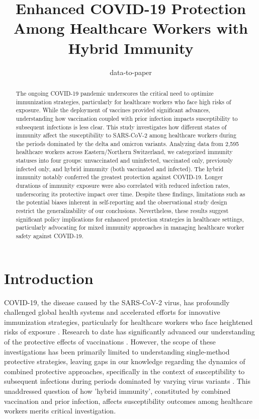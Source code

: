 \documentclass[11pt]{article}
\title{Enhanced COVID-19 Protection Among Healthcare Workers with Hybrid Immunity}
\author{data-to-paper}
\begin{document}
\maketitle
\begin{abstract}
The ongoing COVID-19 pandemic underscores the critical need to optimize immunization strategies, particularly for healthcare workers who face high risks of exposure. While the deployment of vaccines provided significant advances, understanding how vaccination coupled with prior infection impacts susceptibility to subsequent infections is less clear. This study investigates how different states of immunity affect the susceptibility to SARS-CoV-2 among healthcare workers during the periods dominated by the delta and omicron variants. Analyzing data from 2,595 healthcare workers across Eastern/Northern Switzerland, we categorized immunity statuses into four groups: unvaccinated and uninfected, vaccinated only, previously infected only, and hybrid immunity (both vaccinated and infected). The hybrid immunity notably conferred the greatest protection against COVID-19. Longer durations of immunity exposure were also correlated with reduced infection rates, underscoring its protective impact over time. Despite these findings, limitations such as the potential biases inherent in self-reporting and the observational study design restrict the generalizability of our conclusions. Nevertheless, these results suggest significant policy implications for enhanced protection strategies in healthcare settings, particularly advocating for mixed immunity approaches in managing healthcare worker safety against COVID-19.
\end{abstract}
\section*{Introduction}

COVID-19, the disease caused by the SARS-CoV-2 virus, has profoundly challenged global health systems and accelerated efforts for innovative immunization strategies, particularly for healthcare workers who face heightened risks of exposure \cite{Zhao2020AbnormalIO,Goldberg2022ProtectionAW}. Research to date has significantly advanced our understanding of the protective effects of vaccinations \cite{Cavanaugh2021ReducedRO,Cromer2021NeutralisingAT}. However, the scope of these investigations has been primarily limited to understanding single-method protective strategies, leaving gaps in our knowledge regarding the dynamics of combined protective approaches, specifically in the context of susceptibility to subsequent infections during periods dominated by varying virus variants \cite{Goldberg2021ProtectionAW,Nunes2022SARSCoV2OS}. This unaddressed question of how 'hybrid immunity', constituted by combined vaccination and prior infection, affects susceptibility outcomes among healthcare workers merits critical investigation.
\end{document}
